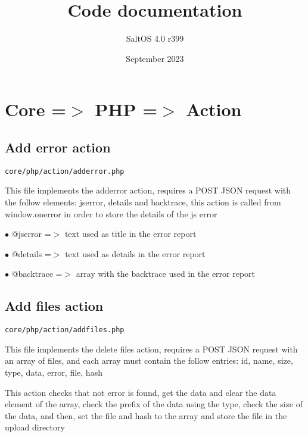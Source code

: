 \documentclass[a4paper]{book}
\title{Code documentation}
\author{SaltOS 4.0 r399}
\begin{document}
\date{September 2023}
\maketitle
\clearpage

\tableofcontents
\clearpage


\hypertarget{toc1}{}
\chapter{Core =$>$ PHP =$>$ Action}

\hypertarget{toc2}{}
\section{Add error action}

\begin{lstlisting}
core/php/action/adderror.php
\end{lstlisting}

This file implements the adderror action, requires a POST JSON request
with the follow elements: jserror, details and backtrace, this action
is called from window.onerror in order to store the details of the js
error

\begin{compactitem}
\item[\color{myblue}$\bullet$] @jserror   =$>$ text used as title in the error report
\item[\color{myblue}$\bullet$] @details   =$>$ text used as details in the error report
\item[\color{myblue}$\bullet$] @backtrace =$>$ array with the backtrace used in the error report
\end{compactitem}

\hypertarget{toc3}{}
\section{Add files action}

\begin{lstlisting}
core/php/action/addfiles.php
\end{lstlisting}

This file implements the delete files action, requires a POST JSON request
with an array of files, and each array must contain the follow entries:
id, name, size, type, data, error, file, hash

This action checks that not error is found, get the data and clear the
data element of the array, check the prefix of the data using the type,
check the size of the data, and then, set the file and hash to the
array and store the file in the upload directory
\end{document}
